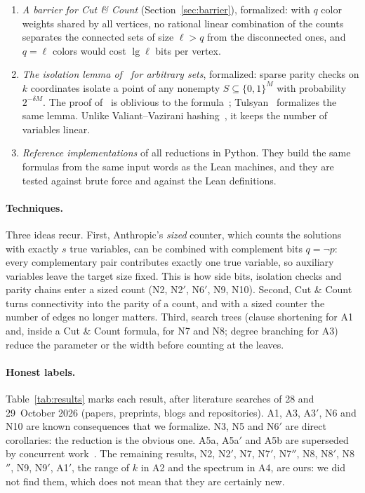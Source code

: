\documentclass[11pt]{article}
\theoremstyle{remark}
\begin{document}
\begin{enumerate}
\item \emph{A barrier for Cut \& Count} (Section~\ref{sec:barrier}), formalized: with $q$ color
weights shared by all vertices, no rational linear combination of the counts separates the
connected sets of size $\ell>q$ from the disconnected ones, and $q=\ell$ colors would cost
$\lg\ell$ bits per vertex.
\item \emph{The isolation lemma of~\cite{CIKP08} for arbitrary sets}, formalized: sparse parity
checks on $k$ coordinates isolate a point of any nonempty $S\subseteq\{0,1\}^M$ with probability
$2^{-\delta M}$. The proof of~\cite{CIKP08} is oblivious to the formula~\cite[\S9.3]{Calabro09};
Tulsyan~\cite{Tul26} formalizes the same lemma. Unlike Valiant--Vazirani hashing~\cite{VV86}, it
keeps the number of variables linear.
\item \emph{Reference implementations} of all reductions in Python. They build the same formulas
from the same input words as the Lean machines, and they are tested against brute force and against
the Lean definitions.
\end{enumerate}

\paragraph{Techniques.} Three ideas recur. First, Anthropic's \emph{sized} counter, which counts
the solutions with exactly $s$ true variables, can be combined with complement bits $q=\neg p$: every
complementary pair contributes exactly one true variable, so auxiliary variables leave the target
size fixed. This is how side bits, isolation checks and parity chains enter a sized count
(N2, N2$'$, N6$'$, N9, N10). Second, Cut \& Count~\cite{CNPPRW11} turns connectivity into the parity of a
count, and with a sized counter the number of edges no longer matters. Third, search trees (clause
shortening for A1 and, inside a Cut \& Count formula, for N7 and N8; degree branching for A3) reduce the
parameter or the width before counting at the leaves.

\paragraph{Honest labels.} Table~\ref{tab:results} marks each result, after literature searches
of 28 and 29~October 2026 (papers, preprints, blogs and repositories). A1, A3, A3$'$, N6 and N10 are known
consequences that we formalize. N3, N5 and N6$'$ are direct corollaries: the reduction is the
obvious one. A5a, A5a$'$ and A5b are superseded by concurrent work~\cite{Tul26}. The remaining
results, N2, N2$'$, N7, N7$'$, N7$''$, N8, N8$'$, N8$''$, N9, N9$'$, A1$'$, the range of $k$ in A2 and the spectrum in A4, are ours: we did not find
them, which does not mean that they are certainly new.
\end{document}
